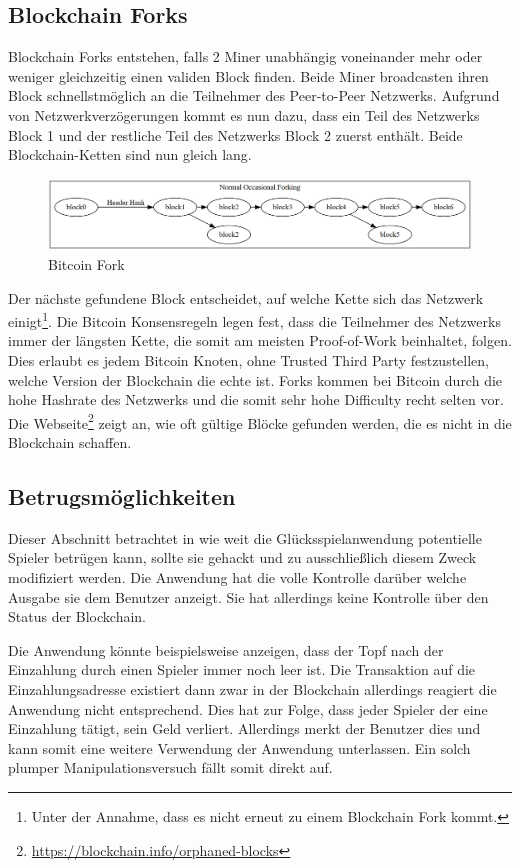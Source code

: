 \subsection{Blockchain Forks} \label{sssec:btc_fork}
Blockchain Forks entstehen, falls 2 Miner unabhängig voneinander mehr oder weniger gleichzeitig einen validen Block finden. Beide Miner broadcasten ihren Block schnellstmöglich an die Teilnehmer des Peer-to-Peer Netzwerks. Aufgrund von Netzwerkverzögerungen kommt es nun dazu, dass ein Teil des Netzwerks Block 1 und der restliche Teil des Netzwerks Block 2 zuerst enthält. Beide Blockchain-Ketten sind nun gleich lang.
\begin{figure}[H]
\centering
\includegraphics[width=1\linewidth]{Figures/btc/fork_normal}
\decoRule
\caption{Bitcoin Fork}
\label{fig:fork_normal}
\end{figure}
Der nächste gefundene Block entscheidet, auf welche Kette sich das Netzwerk einigt\footnote{Unter der Annahme, dass es nicht erneut zu einem Blockchain Fork kommt.}. Die Bitcoin Konsensregeln legen fest, dass die Teilnehmer des Netzwerks immer der längsten Kette, die somit am meisten Proof-of-Work beinhaltet, folgen. Dies erlaubt es jedem Bitcoin Knoten, ohne Trusted Third Party festzustellen, welche Version der Blockchain die echte ist. Forks kommen bei Bitcoin durch die hohe Hashrate des Netzwerks und die somit sehr hohe Difficulty recht selten vor. Die Webseite\footnote{\url{https://blockchain.info/orphaned-blocks}} zeigt an, wie oft gültige Blöcke gefunden werden, die es nicht in die Blockchain schaffen.

\subsection{Betrugsmöglichkeiten}

Dieser Abschnitt betrachtet in wie weit die Glücksspielanwendung potentielle Spieler betrügen kann, sollte sie gehackt und zu ausschließlich diesem Zweck modifiziert werden.
Die Anwendung hat die volle Kontrolle darüber welche Ausgabe sie dem Benutzer anzeigt. Sie hat allerdings keine Kontrolle über den Status der Blockchain. 

Die Anwendung könnte beispielsweise anzeigen, dass der Topf nach der Einzahlung durch einen Spieler immer noch leer ist. Die Transaktion auf die Einzahlungsadresse existiert dann zwar in der Blockchain allerdings reagiert die Anwendung nicht entsprechend. Dies hat zur Folge, dass jeder Spieler der eine Einzahlung tätigt, sein Geld verliert. Allerdings merkt der Benutzer dies und kann somit eine weitere Verwendung der Anwendung unterlassen. Ein solch plumper Manipulationsversuch fällt somit direkt auf.

